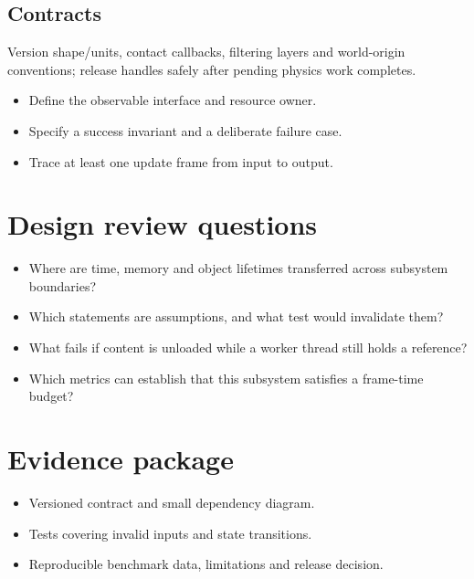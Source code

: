 \documentclass[11pt,letterpaper]{article}
\begin{document}
\subsection{Contracts}
Version shape/units, contact callbacks, filtering layers and world-origin conventions; release handles safely after pending physics work completes.

\begin{itemize}
\item Define the observable interface and resource owner.
\item Specify a success invariant and a deliberate failure case.
\item Trace at least one update frame from input to output.
\end{itemize}
\section{Design review questions}
\begin{itemize}
\item Where are time, memory and object lifetimes transferred across subsystem boundaries?
\item Which statements are assumptions, and what test would invalidate them?
\item What fails if content is unloaded while a worker thread still holds a reference?
\item Which metrics can establish that this subsystem satisfies a frame-time budget?
\end{itemize}
\section{Evidence package}
\begin{itemize}
\item Versioned contract and small dependency diagram.
\item Tests covering invalid inputs and state transitions.
\item Reproducible benchmark data, limitations and release decision.
\end{itemize}
\end{document}
